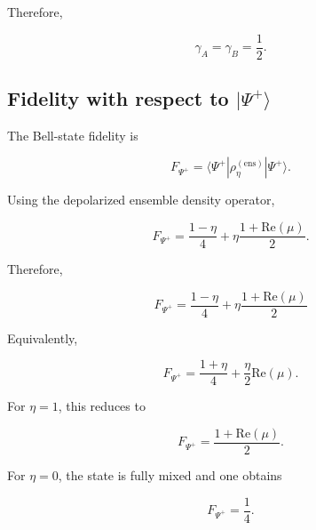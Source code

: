 Therefore,

\begin{equation}
\boxed{
\gamma_A
=
\gamma_B
=
\frac12
}.
\label{eq:appendix_ensemble_reduced_purity}
\end{equation}


\subsection*{Fidelity with respect to \texorpdfstring{\( |\Psi^+\rangle \)}{|Psi+>}}

The Bell-state fidelity is

\begin{equation}
F_{\Psi^+}
=
\langle
\Psi^+
|
\rho_{\eta}^{(\mathrm{ens})}
|
\Psi^+
\rangle.
\end{equation}

Using the depolarized ensemble density operator,

\begin{equation}
F_{\Psi^+}
=
\frac{1-\eta}{4}
+
\eta
\frac{
1+\mathrm{Re}(\mu)
}{2}.
\end{equation}

Therefore,

\begin{equation}
\boxed{
F_{\Psi^+}
=
\frac{1-\eta}{4}
+
\eta
\frac{
1+\mathrm{Re}(\mu)
}{2}
}
\label{eq:appendix_ensemble_fidelity}
\end{equation}

Equivalently,

\begin{equation}
F_{\Psi^+}
=
\frac{1+\eta}{4}
+
\frac{\eta}{2}
\mathrm{Re}(\mu).
\end{equation}

\medskip

For \( \eta=1 \), this reduces to

\begin{equation}
F_{\Psi^+}
=
\frac{
1+\mathrm{Re}(\mu)
}{2}.
\end{equation}

For \( \eta=0 \), the state is fully mixed and one obtains

\begin{equation}
F_{\Psi^+}
=
\frac14.
\end{equation}


